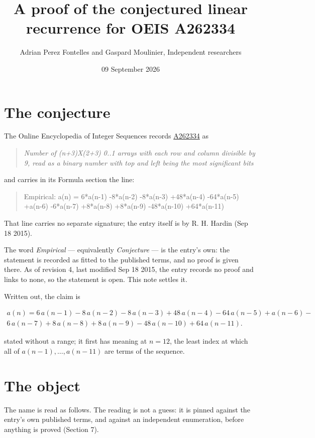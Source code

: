 \documentclass[11pt]{article}
\title{A proof of the conjectured linear recurrence for OEIS A262334}
\author{Adrian Perez Fontelles and Gaspard Moulinier, Independent researchers}
\date{09 September 2026}
\theoremstyle{definition}
\begin{document}
\maketitle
\section{The conjecture}

The Online Encyclopedia of Integer Sequences records \href{https://oeis.org/A262334}{A262334} as

\begin{quote}\itshape Number of (n+3)X(2+3) 0..1 arrays with each row and column divisible by 9, read as a binary number with top and left being the most significant bits\end{quote}

and carries in its Formula section the line:

\begin{quote}\ttfamily Empirical: a(n) = 6*a(n-1) -8*a(n-2) -8*a(n-3) +48*a(n-4) -64*a(n-5) +a(n-6) -6*a(n-7) +8*a(n-8) +8*a(n-9) -48*a(n-10) +64*a(n-11)\end{quote}

That line carries no separate signature; the entry itself is by R. H. Hardin (Sep 18 2015).

The word {\itshape Empirical} --- equivalently {\itshape Conjecture} --- is the entry's own: the statement is recorded as fitted to the published terms, and no proof is given there. As of revision 4, last modified Sep 18 2015, the entry records no proof and links to none, so the statement is open. This note settles it.

Written out, the claim is

\begin{multline*} a(n) = 6\,a(n-1) - 8\,a(n-2) - 8\,a(n-3) + 48\,a(n-4) - 64\,a(n-5) + a(n-6) - \\ 6\,a(n-7) + 8\,a(n-8) + 8\,a(n-9) - 48\,a(n-10) + 64\,a(n-11). \end{multline*}

stated without a range; it first has meaning at $n = 12$, the least index at which all of $a(n-1),\dots,a(n-11)$ are terms of the sequence.

\section{The object}

The name is read as follows. The reading is not a guess: it is pinned against the entry's own published terms, and against an independent enumeration, before anything is proved (Section 7).
\end{document}
